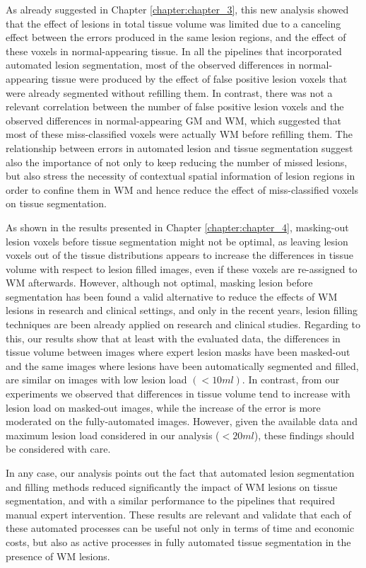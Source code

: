 As already suggested in Chapter \ref{chapter:chapter_3}, this new analysis showed that the effect of lesions in total tissue volume was limited due to a canceling effect between the errors produced in the same lesion regions, and the effect of these voxels in normal-appearing tissue. In all the pipelines that incorporated automated lesion segmentation, most of the observed differences in normal-appearing tissue were produced by the effect of false positive lesion voxels that were already segmented without refilling them. In contrast, there was not a relevant correlation between the number of false positive lesion voxels and the observed differences in normal-appearing GM and WM, which suggested that most of these miss-classified voxels were actually WM before refilling them. The relationship between errors in automated lesion and tissue segmentation suggest also the importance of not only to keep reducing the number of missed lesions, but also stress the necessity of contextual spatial information of lesion regions in order to confine them in WM and hence reduce the effect of miss-classified voxels on tissue segmentation.

As shown in the results presented in Chapter \ref{chapter:chapter_4}, masking-out lesion voxels before tissue segmentation might not be optimal, as leaving lesion voxels out of the tissue distributions appears to increase the differences in tissue volume with respect to lesion filled images, even if these voxels are re-assigned to WM afterwards. However, although not optimal, masking lesion before segmentation has been found a valid alternative to reduce the effects of WM lesions in research and clinical settings, and only in the recent years, lesion filling techniques are been already applied on research and clinical studies. Regarding to this, our results show that at least with the evaluated data, the differences in tissue volume between images where expert lesion masks have been masked-out and the same images where lesions have been automatically segmented and filled, are similar on images with low lesion load $(<10ml)$. In contrast, from our experiments we observed that differences in tissue volume tend to increase with lesion load on masked-out images, while the increase of the error is more moderated on the fully-automated images. However, given the available data and maximum lesion load considered in our analysis ($<20ml$), these findings should be considered with care. 

In any case, our analysis points out the fact that automated lesion segmentation and filling methods reduced significantly the impact of WM lesions on tissue segmentation, and with a similar performance to the pipelines that required manual expert intervention. These results are relevant and validate that each of these automated processes can be useful not only in terms of time and economic costs, but also as active processes in fully automated tissue segmentation in the presence of WM lesions.

